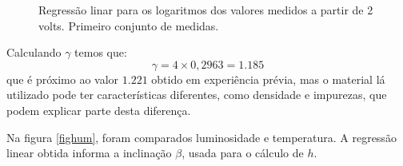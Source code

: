\documentclass[brazilian,12pt,a4paper,final]{article}
\begin{document}
\begin{figure}[htbp!]
  \caption{Regressão linar para os logaritmos dos valores medidos a partir de 2 volts. Primeiro conjunto de medidas.}
  \label{figfimpeq}
  \centering
\end{figure}

Calculando $\gamma$ temos que:
$$\gamma=4\times 0,2963=1.185$$
que é próximo ao valor $1.221$ obtido em experiência prévia,
mas o material lá utilizado pode ter características diferentes,
como densidade e impurezas, que podem explicar parte desta diferença.


Na figura \ref{fighum}, foram comparados luminosidade e temperatura.
A regressão linear obtida informa a inclinação $\beta$, usada para o cálculo de $h$.
\end{document}
